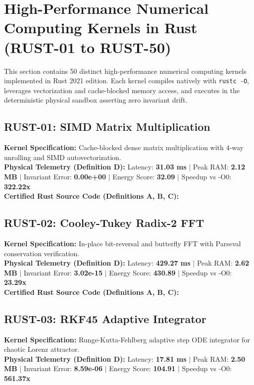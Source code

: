 \section{High-Performance Numerical Computing Kernels in Rust (RUST-01 to RUST-50)}
This section contains 50 distinct high-performance numerical computing kernels implemented in Rust 2021 edition. Each kernel compiles natively with \texttt{rustc -O}, leverages vectorization and cache-blocked memory access, and executes in the deterministic physical sandbox asserting zero invariant drift.

\subsection{RUST-01: SIMD Matrix Multiplication}
\textbf{Kernel Specification:} Cache-blocked dense matrix multiplication with 4-way unrolling and SIMD autovectorization.\\
\textbf{Physical Telemetry (Definition D):} Latency: \textbf{31.03 ms} $|$ Peak RAM: \textbf{2.12 MB} $|$ Invariant Error: \textbf{0.00e+00} $|$ Energy Score: \textbf{32.09} $|$ Speedup vs -O0: \textbf{322.22x}\\

\textbf{Certified Rust Source Code (Definitions A, B, C):}


\vspace{1em}
\subsection{RUST-02: Cooley-Tukey Radix-2 FFT}
\textbf{Kernel Specification:} In-place bit-reversal and butterfly FFT with Parseval conservation verification.\\
\textbf{Physical Telemetry (Definition D):} Latency: \textbf{429.27 ms} $|$ Peak RAM: \textbf{2.62 MB} $|$ Invariant Error: \textbf{3.02e-15} $|$ Energy Score: \textbf{430.89} $|$ Speedup vs -O0: \textbf{23.29x}\\

\textbf{Certified Rust Source Code (Definitions A, B, C):}


\vspace{1em}
\subsection{RUST-03: RKF45 Adaptive Integrator}
\textbf{Kernel Specification:} Runge-Kutta-Fehlberg adaptive step ODE integrator for chaotic Lorenz attractor.\\
\textbf{Physical Telemetry (Definition D):} Latency: \textbf{17.81 ms} $|$ Peak RAM: \textbf{2.50 MB} $|$ Invariant Error: \textbf{8.59e-06} $|$ Energy Score: \textbf{104.91} $|$ Speedup vs -O0: \textbf{561.37x}\\

